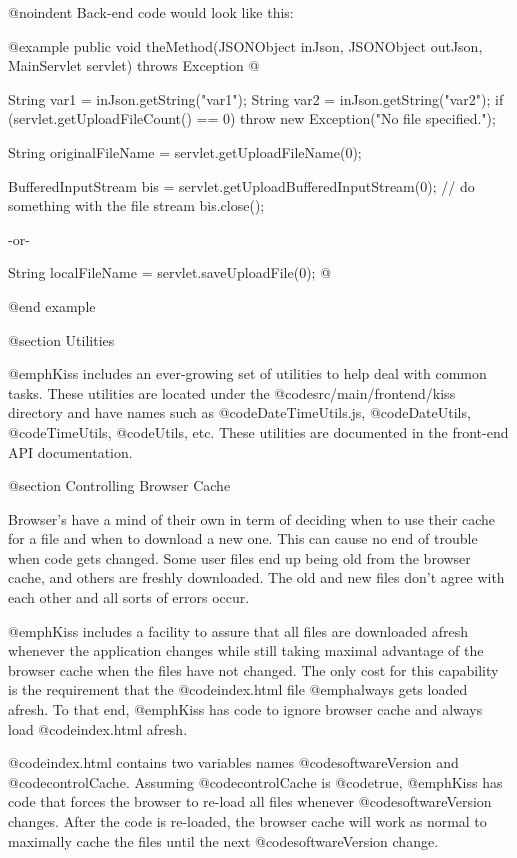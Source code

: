 @noindent
Back-end code would look like this:

@example
public void theMethod(JSONObject inJson, JSONObject outJson, MainServlet servlet) throws Exception @{
    String var1 = inJson.getString("var1");
    String var2 = inJson.getString("var2");
    if (servlet.getUploadFileCount() == 0)
        throw new Exception("No file specified.");
        
    String originalFileName = servlet.getUploadFileName(0);
    
    
    BufferedInputStream bis = servlet.getUploadBufferedInputStream(0);
    // do something with the file stream
    bis.close();
    
         -or-
         
    String localFileName = servlet.saveUploadFile(0);
@}
@end example




@section Utilities

@emph{Kiss} includes an ever-growing set of utilities to help deal with common tasks.
These utilities are located under the @code{src/main/frontend/kiss} directory and have names such as
@code{DateTimeUtils.js}, @code{DateUtils}, @code{TimeUtils}, @code{Utils}, etc.  These utilities
are documented in the front-end API documentation.

@section Controlling Browser Cache

Browser's have a mind of their own in term of deciding when to use
their cache for a file and when to download a new one.  This can cause
no end of trouble when code gets changed.  Some user files end up
being old from the browser cache, and others are freshly downloaded.
The old and new files don't agree with each other and all sorts of
errors occur.

@emph{Kiss} includes a facility to assure that all files are
downloaded afresh whenever the application changes while still taking
maximal advantage of the browser cache when the files have not
changed.  The only cost for this capability is the requirement
that the @code{index.html} file @emph{always} gets loaded afresh.
To that end, @emph{Kiss} has code to ignore browser cache and always load
@code{index.html} afresh.

@code{index.html} contains two variables names @code{softwareVersion} and @code{controlCache}.
Assuming @code{controlCache} is @code{true}, @emph{Kiss} has code that forces the browser
to re-load all files whenever @code{softwareVersion} changes.  After the code is re-loaded,
the browser cache will work as normal to maximally cache the files until the next
@code{softwareVersion} change.


